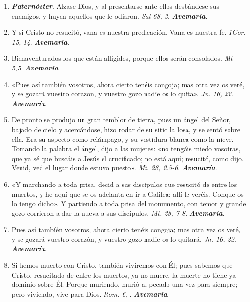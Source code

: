 \documentclass[./rosary.tex]{subfiles}
\begin{document}
\begin{enumerate}
    \item \textbf{\emph{Paternóster}}. Alzase Dios, y al presentarse ante ellos desbándese sus enemigos, y huyen aquellos que le odiaron. \emph{Sal 68, 2}. \textbf{\emph{Avemaría}}.

    \item Y si Cristo no resucitó, vana es nuestra predicación. Vana es nuestra fe. \emph{1Cor. 15, 14}. \textbf{\emph{Avemaría}}.

    \item Bienaventurados los que están afligidos, porque ellos serán consolados. \emph{Mt 5,5}. \textbf{\emph{Avemaría}}.

    \item «Pues así también vosotros, ahora cierto tenéis congoja; mas otra vez os veré, y se gozará vuestro corazon, y vuestro gozo nadie os lo quita». \emph{Jn. 16, 22}. \textbf{\emph{Avemaría}}.

    \item De pronto se produjo un gran temblor de tierra, pues un ángel del Señor, bajado de cielo y acercándose, hizo rodar de su sitio la losa, y se sentó sobre ella.
          Era su aspecto como relámpago, y su vestidura blanca como la nieve. Tomando la palabra el ángel, dijo a las mujeres: «no tengáis miedo vosotras, que ya sé que buscáis
          a Jesús el crucificado; no está aquí; resucitó, como dijo. Venid, ved el lugar donde estuvo puesto». \emph{Mt. 28, 2.5-6}. \textbf{\emph{Avemaría}}.

    \item «Y marchando a toda prisa, decid a sus discípulos que resucitó de entre los muertos, y he aquí que se os adelanta en ir a Galilea: allí le veréis. Conque os lo tengo dicho».
          Y partiendo a toda prisa del monumento, con temor y grande gozo corrieron a dar la nueva a sus discípulos. \emph{Mt. 28, 7-8}. \textbf{\emph{Avemaría}}.

    \item Pues así tambíén vosotros, ahora cierto tenéis congoja; mas otra vez os veré, y se gozará vuestro corazón, y vuestro gozo nadie os lo quitará. \emph{Jn. 16, 22}. \textbf{\emph{Avemaría}}.

    \item Si hemos muerto con Cristo, también viviremos con Él; pues sabemos que Cristo, resucitado de entre los muertos, ya no muere, la muerte no tiene ya dominio sobre Él. Porque
          muriendo, murió al pecado una vez para siempre; pero viviendo, vive para Dios. \emph{Rom. 6, }. \textbf{\emph{Avemaría}}.


\end{enumerate}
\end{document}
